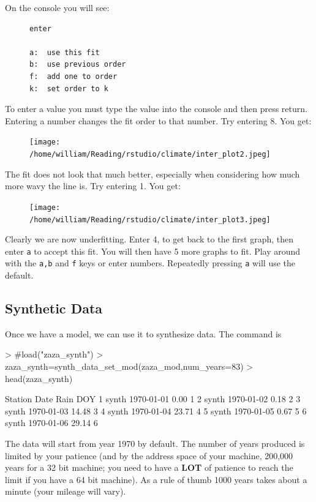 \documentclass{article}
\begin{document}
On the console you will see:

\begin{figure}[h!]
\centering
\begin{verbatim}
enter

a:  use this fit
b:  use previous order
f:  add one to order
k:  set order to k
\end{verbatim}
\end{figure}
To enter a value you must type the value into the console and then press
return.  Entering a number changes the fit order to that number.  Try entering
8.  You get:

\begin{figure}[H]
\centering
\texttt{[image: /home/william/Reading/rstudio/climate/inter\_plot2.jpeg]}
\end{figure}

The fit does not look that much better, especially when considering
how much more wavy the line is.  Try entering 1.  You get:

\begin{figure}[H]
\centering
\texttt{[image: /home/william/Reading/rstudio/climate/inter\_plot3.jpeg]}
\end{figure}


Clearly we are now underfitting.   Enter 4, to get back to the first graph,
then enter {\tt a} to accept this fit.  You will then have 5 more graphs
to fit. Play around with the {\tt a,b} and {\tt f} keys or enter numbers.
Repeatedly pressing {\tt a} will use the default.

\subsection{Synthetic Data}

Once we have a model, we can use it to synthesize data.  The command is

\begin{Schunk}
\begin{Sinput}
> #load("zaza_synth")
> zaza_synth=synth_data_set_mod(zaza_mod,num_years=83)
> head(zaza_synth)
\end{Sinput}
\begin{Soutput}
  Station       Date  Rain DOY
1   synth 1970-01-01  0.00   1
2   synth 1970-01-02  0.18   2
3   synth 1970-01-03 14.48   3
4   synth 1970-01-04 23.71   4
5   synth 1970-01-05  0.67   5
6   synth 1970-01-06 29.14   6
\end{Soutput}
\end{Schunk}
The data will start from year 1970 by default.  The number
of years produced is limited by your patience (and by the address space of your
machine,  200,000 years for a 32 bit machine; you need to have a {\bf LOT} of patience to reach the limit if you 
have a 64 bit machine).
As a rule of thumb 1000 years takes about a minute (your mileage will vary).
\end{document}

